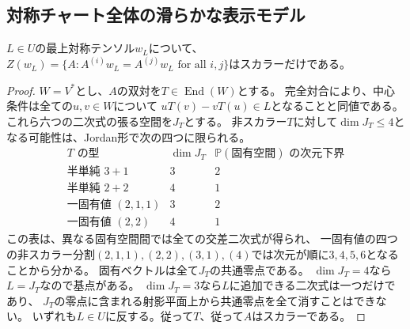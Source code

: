 \subsection{対称チャート全体の滑らかな表示モデル}
\begin{lemma}[四二次完全交叉のtraceの中心]\label{lem:ci-tensor-centroid-scalar}
$L\in U$の最上対称テンソル$w_L$について、
$Z(w_L)=\{A:A^{(i)}w_L=A^{(j)}w_L\text{ for all }i,j\}$はスカラーだけである。
\end{lemma}
\begin{proof}
$W=V^*$とし、$A$の双対を$T\in\operatorname{End}(W)$とする。
完全対合により、中心条件は全ての$u,v\in W$について
$uT(v)-vT(u)\in L$となることと同値である。
これら六つの二次式の張る空間を$J_T$とする。
非スカラー$T$に対して$\dim J_T\leq4$となる可能性は、Jordan形で次の四つに限られる。
\[
\begin{array}{c|c|c}
 T\text{ の型}&\dim J_T&\mathbb P(\text{固有空間})\text{ の次元下界}\\\hline
 \text{半単純 }3+1&3&2\\
 \text{半単純 }2+2&4&1\\
 \text{一固有値 }(2,1,1)&3&2\\
 \text{一固有値 }(2,2)&4&1
\end{array}
\]
この表は、異なる固有空間間では全ての交差二次式が得られ、
一固有値の四つの非スカラー分割$(2,1,1),(2,2),(3,1),(4)$では次元が順に$3,4,5,6$となることから分かる。
固有ベクトルは全て$J_T$の共通零点である。
$\dim J_T=4$なら$L=J_T$なので基点がある。
$\dim J_T=3$なら$L$に追加できる二次式は一つだけであり、
$J_T$の零点に含まれる射影平面上から共通零点を全て消すことはできない。
いずれも$L\in U$に反する。従って$T$、従って$A$はスカラーである。
\end{proof}

